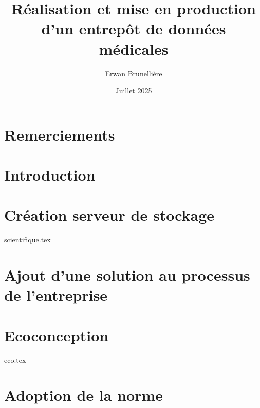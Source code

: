\documentclass{memoireStyle}
\title{Réalisation et mise en production d'un entrepôt de données médicales}
\author{Erwan Brunellière}
\affil{IDIA 2025}
\affil{Polytech Nantes}
\date{Juillet 2025}
\begin{document}
\frontPage

\setStyle

\chapter*{Remerciements}

\chapter*{Introduction}

\tableofcontents

\chapter{Création serveur de stockage}
{scientifique.tex}


\chapter{Ajout d'une solution au processus de l'entreprise}

\chapter{Ecoconception}
{eco.tex}

\chapter{Adoption de la norme}



\end{document}
